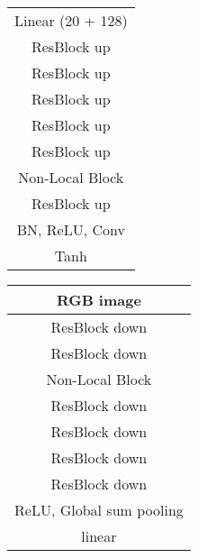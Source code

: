 \documentclass[10pt,twocolumn,letterpaper]{article}
\begin{document}
\begin{table*}[t]
	\begin{minipage}[t]{.45\textwidth}
	\centering
	\begin{tabular}{c}
		\hline 	\hline
		 \\
		\hline
		Linear (20 + 128)  \\
		\hline
		ResBlock up  \\
		\hline
		ResBlock up  \\
		\hline
		ResBlock up  \\
		\hline
		ResBlock up  \\
		\hline
		ResBlock up  \\
		\hline
		Non-Local Block  \\
		\hline
		ResBlock up  \\
		\hline
		BN, ReLU,  Conv  \\
		\hline
		Tanh \\
		\hline 	\hline
	\end{tabular}
\end{minipage}  \hspace{0.5cm}
	\begin{minipage}[t]{.45\textwidth}
	\centering
	\begin{tabular}{c}
	\hline 	\hline
    RGB image  \\
	\hline
	ResBlock down  \\
	\hline
	ResBlock down  \\
	\hline
	Non-Local Block  \\
	\hline
	ResBlock down  \\
	\hline
	ResBlock down  \\
	\hline
	ResBlock down  \\
	\hline
	ResBlock down  \\
	\hline
	ReLU, Global sum pooling \\
	\hline
	linear\\
	\hline 	\hline
     \end{tabular}
\end{minipage} \hspace{0.5cm}	


    \caption{The BigGAN~\cite{Brock2019} generator and discriminator architectures for class-conditional and unconditional tasks of generating images at different resolutions. Top (a and b): The class-conditional BigGAN model for resolution . Bottom (c and d): The BigGAN model for resolution , modified to be \textit{un}conditional.} \label{table:supp_biggan_arch} \end{table*}
\end{document}

